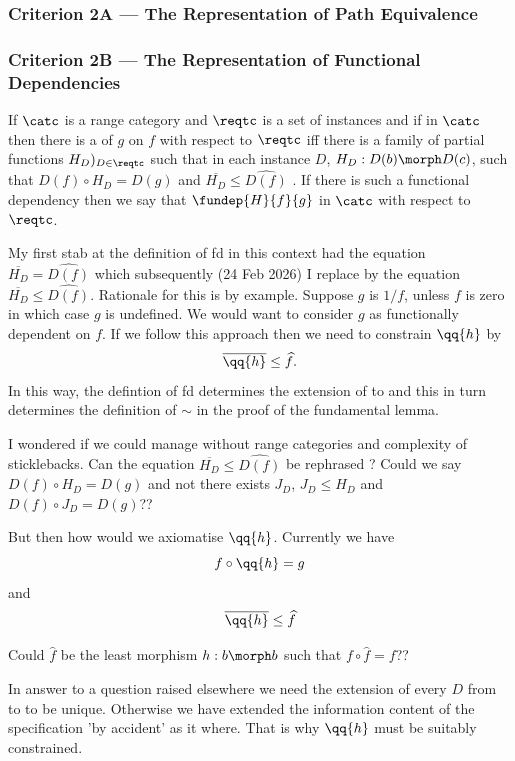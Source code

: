 
\subsubsection{Criterion 2A --- The Representation of Path Equivalence}
\tbd

\subsubsection{Criterion 2B --- The Representation of Functional Dependencies}
\begin{definition}
If $\catc$ is a range category and $\reqtc$ is a set of instances and if \fgsourcediag
in $\catc$ then there is a   of $g$ on $f$ with respect to $\reqtc$ iff
there is a family of partial functions $H_D)_{D \in \reqtc}$ such that 
in each instance $D$,  $H_D: D(b) \morph D(c)$, such that $D(f) \circ H_D = D(g)$ and $\overline{H_D}\leq \widehat{D(f)}$ .
If there is such a functional dependency then we say that $\fundep{H}{f}{g}$ in $\catc$ with respect to $\reqtc$.


\begin{rationale}
My first stab at the definition of fd in this context had
the equation $\overline{H_D}=\widehat{D(f)}$ which
subsequently (24 Feb 2026)
I replace by the equation 
$\overline{H_D}\leq \widehat{D(f)}$. 
Rationale for this is by example. Suppose $g$ is $1/f$, 
unless $f$ is zero in which case $g$ is undefined. 
We would want to consider  $g$ as functionally dependent on $f$. 
If we follow this approach then we need to constrain
$\qq{h}$ by 
$$
\overline{\qq{h}} \leq \widehat{f}.
$$
In this way, the defintion of fd determines  the
extension of \catcw to \catcpw and this in turn determines the definition of $\sim$ in the proof of the fundamental lemma.
\end{rationale}
\begin{rationale}
I wondered if  we could manage without range categories and complexity of sticklebacks.
Can the equation $\overline{H_D}\leq \widehat{D(f)}$ be rephrased ?
Could we say $D(f) \circ H_D =D(g)$ and not there exists
$J_D$, $J_D \leq H_D$ and $D(f) \circ J_D = D(g)$??

But then how would we axiomatise $\qq{h}$. Currently we have
$$
f \circ \qq{h} = g
$$
and
$$
\overline{\qq{h}} \leq \widehat{f}
$$

\begin{notebox}[wierdly] Could $\hat{f}$ be the least morphism $h: b \morph b$
such that $f \circ \hat{f} = f$?? 
\end{notebox}

In answer to a question raised elsewhere we need the extension of every $D$
from \catcw to \catcpw to be unique. Otherwise we have extended the information content of the specification 'by accident' as it where. That is why $\qq{h}$
must be suitably constrained.
\end{rationale}
\end{definition}


